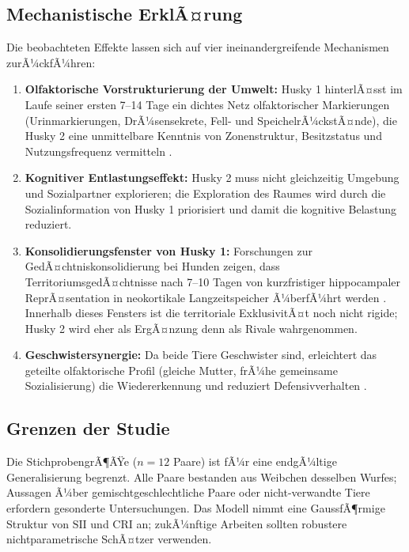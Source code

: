 ﻿\documentclass[12pt, a4paper]{article}
\theoremstyle{plain}
\theoremstyle{definition}
\theoremstyle{remark}
\newcommand{\SII}{\mathrm{SII}}
\newcommand{\CRI}{\mathrm{CRI}}
\begin{document}
\subsection{Mechanistische ErklÃ¤rung}

Die beobachteten Effekte lassen sich auf vier ineinandergreifende
Mechanismen zurÃ¼ckfÃ¼hren:

\begin{enumerate}[leftmargin=*, label=(\arabic*)]
  \item \textbf{Olfaktorische Vorstrukturierung der Umwelt:} Husky 1 hinterlÃ¤sst
    im Laufe seiner ersten 7--14 Tage ein dichtes Netz olfaktorischer Markierungen
    (Urinmarkierungen, DrÃ¼sensekrete, Fell- und SpeichelrÃ¼ckstÃ¤nde), die Husky 2
    eine unmittelbare Kenntnis von Zonenstruktur, Besitzstatus und
    Nutzungsfrequenz vermitteln \cite{wyatt2003pheromones}.

  \item \textbf{Kognitiver Entlastungseffekt:} Husky 2 muss nicht gleichzeitig
    Umgebung und Sozialpartner explorieren; die Exploration des Raumes wird
    durch die Sozialinformation von Husky 1 priorisiert und damit die
    kognitive Belastung reduziert.

  \item \textbf{Konsolidierungsfenster von Husky 1:} Forschungen zur GedÃ¤chtniskonsolidierung
    bei Hunden zeigen, dass TerritoriumsgedÃ¤chtnisse nach 7--10 Tagen von
    kurzfristiger hippocampaler ReprÃ¤sentation in neokortikale Langzeitspeicher
    Ã¼berfÃ¼hrt werden \cite{miklosi2007dog}. Innerhalb dieses Fensters ist die
    territoriale ExklusivitÃ¤t noch nicht rigide; Husky 2 wird eher als ErgÃ¤nzung
    denn als Rivale wahrgenommen.

  \item \textbf{Geschwistersynergie:} Da beide Tiere Geschwister sind, erleichtert
    das geteilte olfaktorische Profil (gleiche Mutter, frÃ¼he gemeinsame
    Sozialisierung) die Wiedererkennung und reduziert Defensivverhalten
    \cite{pal2005pup}.
\end{enumerate}

\subsection{Grenzen der Studie}

Die StichprobengrÃ¶ÃŸe ($n = 12$ Paare) ist fÃ¼r eine endgÃ¼ltige Generalisierung
begrenzt. Alle Paare bestanden aus Weibchen desselben Wurfes; Aussagen Ã¼ber
gemischtgeschlechtliche Paare oder nicht-verwandte Tiere erfordern gesonderte
Untersuchungen. Das Modell nimmt eine GaussfÃ¶rmige Struktur von $\SII$ und
$\CRI$ an; zukÃ¼nftige Arbeiten sollten robustere nichtparametrische SchÃ¤tzer
verwenden.
\end{document}
